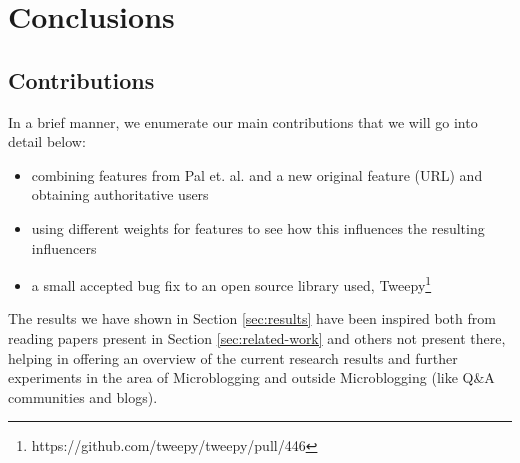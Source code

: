 \chapter{Conclusions}
\label{sec:conclusions}

\section{Contributions}


In a brief manner, we enumerate our main contributions that we will go into detail below:
\begin{itemize}
	\item combining features from Pal et. al.\cite{microblogs} and a new original feature (URL) and obtaining authoritative users
    \item using different weights for features to see how this influences the resulting influencers
    \item a small accepted bug fix to an open source library used, Tweepy\footnote{https://github.com/tweepy/tweepy/pull/446}
\end{itemize}


The results we have shown in Section \ref{sec:results} have been inspired both from reading papers present in Section \ref{sec:related-work} and others not present there, helping in offering an overview of the current research results and further experiments in the area of Microblogging and outside Microblogging (like Q\&A communities and blogs).

